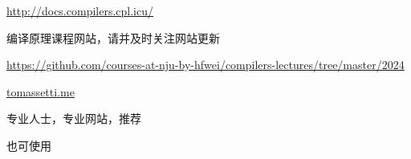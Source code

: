\begin{frame}{}
  \begin{center}
    \url{http://docs.compilers.cpl.icu/} \\[5pt]


    编译原理课程网站，请并及时关注网站更新
  \end{center}
\end{frame}

\begin{frame}{}
  \begin{center}

    \vspace{0.50cm}
    \url{https://github.com/courses-at-nju-by-hfwei/compilers-lectures/tree/master/2024}
  \end{center}
\end{frame}

\begin{frame}{}
  \begin{center}
  \end{center}
\end{frame}

\begin{frame}{}

  \begin{center}
    \href{https://tomassetti.me/}{tomassetti.me}

    \vspace{0.30cm}
    专业人士，专业网站，推荐
  \end{center}
\end{frame}

\begin{frame}{}
  \begin{center}
    也可使用
  \end{center}
\end{frame}

